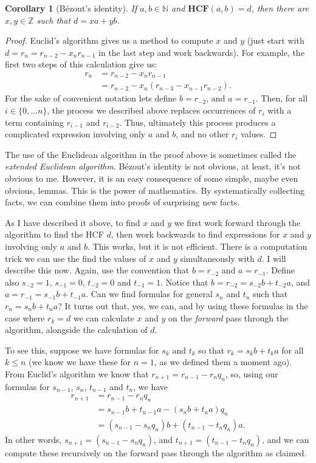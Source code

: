 \documentclass{article}
\theoremstyle{plain}
\newtheorem{corollary}[theorem]{Corollary}{\bfseries}{\upshape}
\newcommand{\bN}{\mathbb{N}}
\newcommand{\bZ}{\mathbb{Z}}
\newcommand{\HCF}{\mathbf{HCF}}
\newcommand*{\prefix}{}
\begin{document}
\begin{corollary}[B\'ezout's identity]\label{\prefix C:bez}
If $a,b\in\bN$ and $\HCF(a,b)=d$, then there are $x,y\in \bZ$ such that $d= xa + yb$. 
\end{corollary}
\begin{proof}
Euclid's algorithm gives us a method to compute $x$ and $y$ (just start with $d = r_n = r_{n-2} - x_n r_{n-1}$ in the last step and work backwards). For example, the first two steps of this calculation give us:
\begin{align*}
r_n&= r_{n-2}-x_nr_{n-1}\\
&= r_{n-2} - x_n(r_{n-3}-x_{n-1}r_{n-2}).
\end{align*}
For the sake of convenient notation lets define $b = r_{-2}$, and $a = r_{-1}$. Then, for all $i\in\{0,\ldots n\}$, the process we described above replaces occurrences of $r_i$ with a term containing $r_{i-1}$ and $r_{i-2}$. Thus, ultimately this process produces a complicated expression involving only $a$ and $b$, and no other $r_i$ values.  
\end{proof}

The use of the Euclidean algorithm in the proof above is sometimes called the \emph{extended Euclidean algorithm}. B\'ezout's identity is not obvious, at least, it's not obvious to me. However, it is an easy consequence of some simple, maybe even obvious, lemmas. This is the power of mathematics. By systematically collecting facts, we can combine them into proofs of surprising new facts. 

As I have described it above, to find $x$ and $y$ we first work forward through the algorithm to find the HCF $d$, then work backwards to find expressions for $x$ and $y$ involving only $a$ and $b$. This works, but it is not efficient. There is a computation trick we can use the find the values of $x$ and $y$ simultaneously with $d$. I will describe this now. Again, use the convention that $b = r_{-2}$ and $a = r_{-1}$. Define also $s_{-2}=1$, $s_{-1}=0$, $t_{-2}=0$ and $t_{-1}=1$. Notice that $b = r_{-2}= s_{-2}b + t_{-2}a$, and $a = r_{-1}=s_{-1}b+t_{-1}a$. Can we find formulas for general $s_n$ and $t_n$ such that $r_n = s_nb + t_n a$? It turns out that, yes, we can, and by using these formulas in the case where $r_k = d$ we can calculate $x$ and $y$ on the \emph{forward} pass through the algorithm, alongside the calculation of $d$. 

To see this, suppose we have formulas for $s_k$ and $t_k$ so that $r_k = s_kb+t_ka$ for all $k\leq n$ (we know we have these for $n=1$, as we defined them a moment ago). From Euclid's algorithm we know that $r_{n+1} = r_{n-1} - r_nq_n$, so, using our formulas for $s_{n-1}$, $s_{n}$, $t_{n-1}$ and $t_{n}$, we have 
\begin{align*}
r_{n+1} &= r_{n-1} - r_nq_n \\
&= s_{n-1}b + t_{n-1}a - (s_n b + t_n a)q_n\\
&= (s_{n-1} - s_nq_n)b +(t_{n-1}-t_nq_n)a.
\end{align*} 
In other words, $s_{n+1} =(s_{n-1} - s_nq_n)$, and $t_{n+1} = (t_{n-1}-t_nq_n)$, and we can compute these recursively on the forward pass through the algorithm as claimed.
\end{document}
